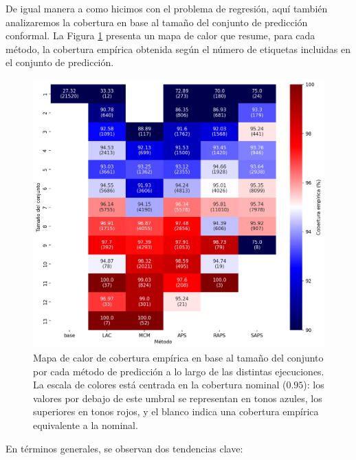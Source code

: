 De igual manera a como hicimos con el problema de regresión, aquí también analizaremos la cobertura en base al tamaño del conjunto de predicción conformal. 
La Figura \ref{fig:AGC_coverage_by_PSS} presenta un mapa de calor que resume, para cada método, la cobertura empírica obtenida según el número de etiquetas incluidas en el conjunto de predicción.

\begin{figure}[htbp]
    \centering
    \includegraphics[width=\textwidth]{capitulos/cap_05/imagenes/AGC_coverage_by_PSS.png}
    \caption[
        Mapa de calor de cobertura empírica en base al tamaño del conjunto por cada método de predicción a lo largo de las distintas ejecuciones.
    ]{
        Mapa de calor de cobertura empírica en base al tamaño del conjunto por cada método de predicción a lo largo de las distintas ejecuciones. 
        La escala de colores está centrada en la cobertura nominal ($0.95$): los valores por debajo de este umbral se representan en tonos azules, los superiores en tonos rojos, y el blanco indica una cobertura empírica equivalente a la nominal.
    }
    \label{fig:AGC_coverage_by_PSS}
\end{figure}

En términos generales, se observan dos tendencias clave:

